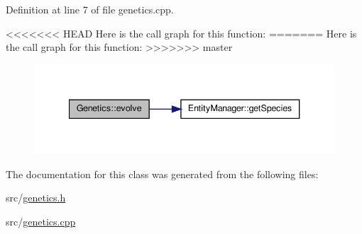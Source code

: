 Definition at line 7 of file genetics.\-cpp.



<<<<<<< HEAD
Here is the call graph for this function\-:
\nopagebreak
=======
Here is the call graph for this function\-:\nopagebreak
>>>>>>> master
\begin{figure}[H]
\begin{center}
\leavevmode
\includegraphics[width=340pt]{class_genetics_a63e33bd3725feb511e19d86e2d07ca3b_cgraph}
\end{center}
\end{figure}




The documentation for this class was generated from the following files\-:\begin{DoxyCompactItemize}
\item 
src/\hyperlink{genetics_8h}{genetics.\-h}\item 
src/\hyperlink{genetics_8cpp}{genetics.\-cpp}\end{DoxyCompactItemize}
